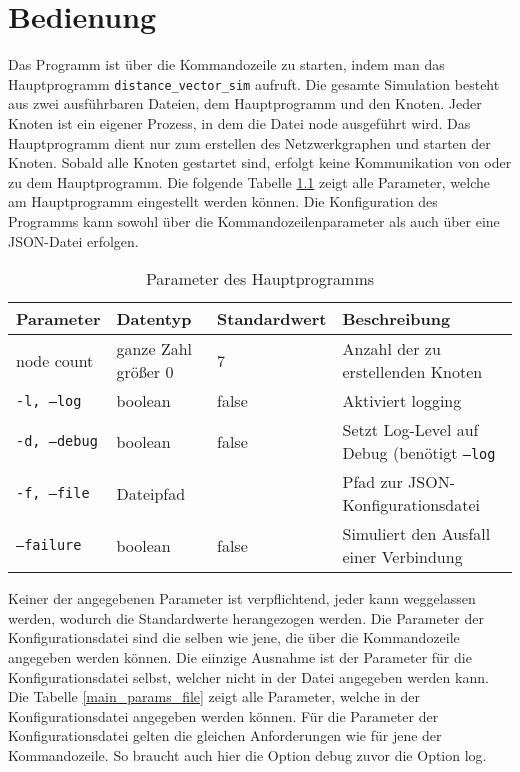 \chapter{Bedienung}
Das Programm ist über die Kommandozeile zu starten, indem man das Hauptprogramm \verb|distance_vector_sim| aufruft. Die gesamte Simulation besteht aus zwei ausführbaren Dateien, dem Hauptprogramm und den Knoten. Jeder Knoten ist ein eigener Prozess, in dem die Datei node ausgeführt wird. Das Hauptprogramm dient nur zum erstellen des Netzwerkgraphen und starten der Knoten. Sobald alle Knoten gestartet sind, erfolgt keine Kommunikation von oder zu dem Hauptprogramm. Die folgende Tabelle \ref{main_params} zeigt alle Parameter, welche am Hauptprogramm eingestellt werden können. Die Konfiguration des Programms kann sowohl über die Kommandozeilenparameter als auch über eine JSON-Datei erfolgen.

\begin{table}
\caption{Parameter des Hauptprogramms}
\label{main_params}
\centering
\begin{tabular}{ | m{3cm} | m{3cm} | m{2.5cm} | m{3cm} | }
\hline
\textbf{Parameter} & \textbf{Datentyp} & \textbf{Standardwert} & \textbf{Beschreibung} \\
\hline
node count & ganze Zahl größer 0 & 7 & Anzahl der zu erstellenden Knoten \\
\hline
\texttt{-l, --log} & boolean & false & Aktiviert logging \\
\hline
\texttt{-d, --debug} & boolean & false & Setzt Log-Level auf Debug (benötigt \texttt{--log} \\
\hline
\texttt{-f, --file} & Dateipfad & & Pfad zur JSON-Konfigurationsdatei \\
\hline
\texttt{--failure} & boolean & false & Simuliert den Ausfall einer Verbindung \\
\hline
\end{tabular}
\end{table}

Keiner der angegebenen Parameter ist verpflichtend, jeder kann weggelassen werden, wodurch die Standardwerte herangezogen werden. Die Parameter der Konfigurationsdatei sind die selben wie jene, die über die Kommandozeile angegeben werden können. Die eiinzige Ausnahme ist der Parameter für die Konfigurationsdatei selbst, welcher nicht in der Datei angegeben werden kann. Die Tabelle \ref{main_params_file} zeigt alle Parameter, welche in der Konfigurationsdatei angegeben werden können. Für die Parameter der Konfigurationsdatei gelten die gleichen Anforderungen wie für jene der Kommandozeile. So braucht auch hier die Option debug zuvor die Option log.

